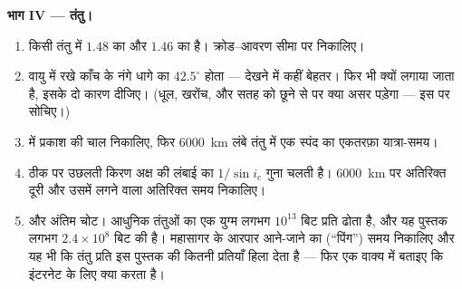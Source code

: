 \begin{problem}
\medskip
\noindent\textbf{भाग IV --- तंतु।}
\begin{enumerate}[resume]
  \item किसी तंतु में $1.48$  का  और $1.46$
         का  है। क्रोड--आवरण सीमा पर
         निकालिए।
  \item वायु में रखे काँच के नंगे धागे का  $42.5^\circ$
        होता --- देखने में कहीं बेहतर। फिर भी  क्यों लगाया
        जाता है, इसके दो कारण दीजिए। (धूल, खरोंच, और सतह को छूने से
         पर क्या असर पड़ेगा --- इस पर
        सोचिए।)
  \item {} में प्रकाश की चाल निकालिए, फिर \qty{6000}{km} लंबे तंतु
        में एक स्पंद का एकतरफ़ा यात्रा-समय।
  \item ठीक  पर उछलती किरण अक्ष की लंबाई का $1/\sin i_c$
        गुना चलती है। \qty{6000}{km} पर अतिरिक्त दूरी और उसमें लगने वाला
        अतिरिक्त समय निकालिए।
  \item और अंतिम चोट। आधुनिक तंतुओं का एक युग्म लगभग $10^{13}$ बिट प्रति
         ढोता है, और यह पुस्तक लगभग $2.4 \times 10^8$ बिट की है। महासागर के
        आरपार आने-जाने का (``पिंग'') समय निकालिए और यह भी कि तंतु प्रति
         इस पुस्तक की कितनी प्रतियाँ हिला देता है --- फिर एक वाक्य
        में बताइए कि  इंटरनेट के लिए क्या करता है।
\end{enumerate}
\end{problem}
